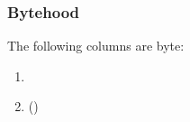 \subsubsection{Bytehood}
The following columns are byte:
\begin{enumerate}
	\item \PBCB{}
	\item \opc{} \quad (\trash{}) 
\end{enumerate}